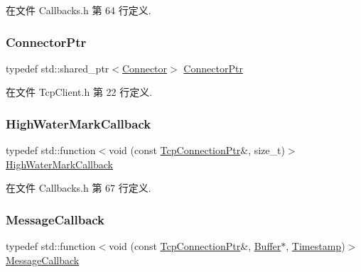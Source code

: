 在文件 Callbacks.\+h 第 64 行定义.

\mbox{\label{namespacemuduo_1_1net_adaac8e7754cfd0ac9c5a680eec411eba}} 
\subsubsection{\texorpdfstring{Connector\+Ptr}{ConnectorPtr}}
{\footnotesize\ttfamily typedef std\+::shared\+\_\+ptr$<$\hyperlink{classmuduo_1_1Connector}{Connector}$>$ \hyperlink{namespacemuduo_1_1net_adaac8e7754cfd0ac9c5a680eec411eba}{Connector\+Ptr}}



在文件 Tcp\+Client.\+h 第 22 行定义.

\mbox{\label{namespacemuduo_1_1net_a503c5e91d2e84874e83e9a6cbfb4a47b}} 
\subsubsection{\texorpdfstring{High\+Water\+Mark\+Callback}{HighWaterMarkCallback}}
{\footnotesize\ttfamily typedef std\+::function$<$void (const \hyperlink{namespacemuduo_1_1net_ab91a46e9290926aa692450e46cfc9039}{Tcp\+Connection\+Ptr}\&, size\+\_\+t)$>$ \hyperlink{namespacemuduo_1_1net_a503c5e91d2e84874e83e9a6cbfb4a47b}{High\+Water\+Mark\+Callback}}



在文件 Callbacks.\+h 第 67 行定义.

\mbox{\label{namespacemuduo_1_1net_acaa802028467a41738aeb49699e85285}} 
\subsubsection{\texorpdfstring{Message\+Callback}{MessageCallback}}
{\footnotesize\ttfamily typedef std\+::function$<$void (const \hyperlink{namespacemuduo_1_1net_ab91a46e9290926aa692450e46cfc9039}{Tcp\+Connection\+Ptr}\&, \hyperlink{classmuduo_1_1net_1_1Buffer}{Buffer}$\ast$, \hyperlink{classmuduo_1_1Timestamp}{Timestamp})$>$ \hyperlink{namespacemuduo_1_1net_acaa802028467a41738aeb49699e85285}{Message\+Callback}}



